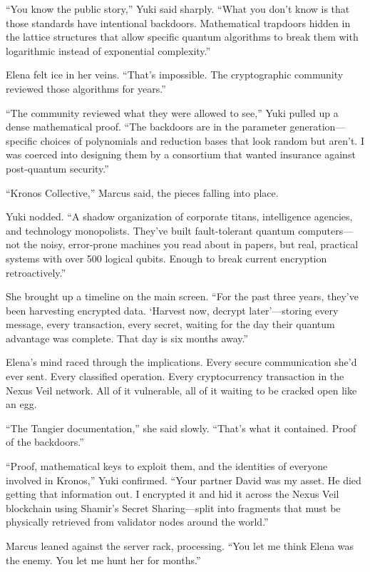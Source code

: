 ``You know the public story,'' Yuki said sharply. ``What you don't know is that those standards have intentional backdoors. Mathematical trapdoors hidden in the lattice structures that allow specific quantum algorithms to break them with logarithmic instead of exponential complexity.''

Elena felt ice in her veins. ``That's impossible. The cryptographic community reviewed those algorithms for years.''

``The community reviewed what they were allowed to see,'' Yuki pulled up a dense mathematical proof. ``The backdoors are in the parameter generation---specific choices of polynomials and reduction bases that look random but aren't. I was coerced into designing them by a consortium that wanted insurance against post-quantum security.''

``Kronos Collective,'' Marcus said, the pieces falling into place.

Yuki nodded. ``A shadow organization of corporate titans, intelligence agencies, and technology monopolists. They've built fault-tolerant quantum computers---not the noisy, error-prone machines you read about in papers, but real, practical systems with over 500 logical qubits. Enough to break current encryption retroactively.''

She brought up a timeline on the main screen. ``For the past three years, they've been harvesting encrypted data. `Harvest now, decrypt later'---storing every message, every transaction, every secret, waiting for the day their quantum advantage was complete. That day is six months away.''

Elena's mind raced through the implications. Every secure communication she'd ever sent. Every classified operation. Every cryptocurrency transaction in the Nexus Veil network. All of it vulnerable, all of it waiting to be cracked open like an egg.

``The Tangier documentation,'' she said slowly. ``That's what it contained. Proof of the backdoors.''

``Proof, mathematical keys to exploit them, and the identities of everyone involved in Kronos,'' Yuki confirmed. ``Your partner David was my asset. He died getting that information out. I encrypted it and hid it across the Nexus Veil blockchain using Shamir's Secret Sharing---split into fragments that must be physically retrieved from validator nodes around the world.''

Marcus leaned against the server rack, processing. ``You let me think Elena was the enemy. You let me hunt her for months.''

